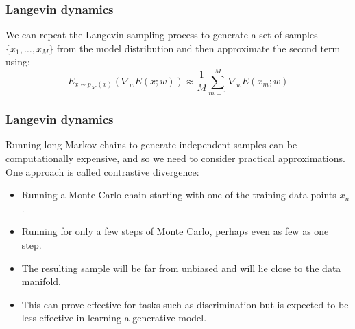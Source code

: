 \documentclass{beamer}
\begin{document}
\begin{frame}
    \frametitle{Langevin dynamics}
    We can repeat the Langevin sampling process to generate a set of samples $\{x_{1},\hdots,x_{M}\}$ from the model distribution and then approximate the second term using:
    \begin{equation*}
        E_{x\sim{}p_{\mathcal{M}}(x)}(\nabla_{w}E(x;w))\approx\frac{1}{M}\sum_{m=1}^{M}\nabla_{w}E(x_{m};w)
    \end{equation*}
\end{frame}

\begin{frame}
    \frametitle{Langevin dynamics}
    Running long Markov chains to generate independent samples can be computationally expensive, and so we need to consider practical approximations. One approach is called contrastive divergence:
    \begin{itemize}
        \item Running a Monte Carlo chain starting with one of the training data points $x_{n}$.
        \item Running for only a few steps of Monte Carlo, perhaps even as few as one step.
        \item The resulting sample will be far from unbiased and will lie close to the data manifold.
        \item This can prove effective for tasks such as discrimination but is expected to be less effective in learning a generative model.
    \end{itemize}
\end{frame}
\end{document}
